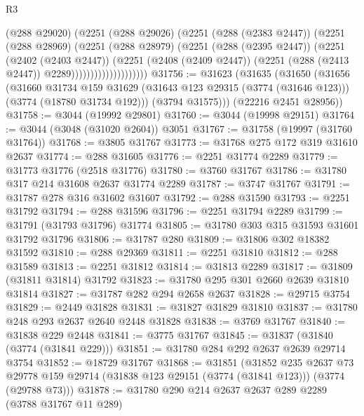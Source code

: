 \begin{lexlean}{R3}
\begin{coremodule}
                            (@288 @29020)
                            (@2251
                              (@288 @29026)
                              (@2251
                                (@288 (@2383 @2447))
                                (@2251
                                  (@288 @28969)
                                  (@2251
                                    (@288 @28979)
                                    (@2251
                                      (@288 (@2395 @2447))
                                      (@2251
                                        (@2402 (@2403 @2447))
                                        (@2251
                                          (@2408 (@2409 @2447))
                                          (@2251 (@288 (@2413 @2447)) @2289))))))))))))))))))))
@31756 := @31623
    (@31635
      (@31650
        (@31656
          (@31660
            @31734
            @159
            @31629
            (@31643 @123 @29315 (@3774 (@31646 @123)))
            (@3774 (@18780 @31734 @192)))
          (@3794 @31575)))
      (@22216 @2451 @28956))
@31758 := @3044 (@19992 @29801)
@31760 := @3044 (@19998 @29151)
@31764 := @3044 (@3048 (@31020 @2604)) @3051
@31767 := @31758 (@19997 (@31760 @31764))
@31768 := @3805 @31767
@31773 := @31768 @275 @172 @319 @31610 @2637
@31774 := @288 @31605
@31776 := @2251 @31774 @2289
@31779 := @31773 @31776 (@2518 @31776)
@31780 := @3760 @31767
@31786 := @31780 @317 @214 @31608 @2637 @31774 @2289
@31787 := @3747 @31767
@31791 := @31787 @278 @316 @31602 @31607
@31792 := @288 @31590
@31793 := @2251 @31792
@31794 := @288 @31596
@31796 := @2251 @31794 @2289
@31799 := @31791 (@31793 @31796) @31774
@31805 := @31780 @303 @315 @31593 @31601 @31792 @31796
@31806 := @31787 @280
@31809 := @31806 @302 @18382 @31592
@31810 := @288 @29369
@31811 := @2251 @31810
@31812 := @288 @31589
@31813 := @2251 @31812
@31814 := @31813 @2289
@31817 := @31809 (@31811 @31814) @31792
@31823 := @31780 @295 @301 @2660 @2639 @31810 @31814
@31827 := @31787 @282 @294 @2658 @2637
@31828 := @29715 @3754
@31829 := @2449 @31828
@31831 := @31827 @31829 @31810
@31837 := @31780 @248 @293 @2637 @2640 @2448 @31828
@31838 := @3769 @31767
@31840 := @31838 @229 @2448
@31841 := @3775 @31767
@31845 := @31837 (@31840 (@3774 (@31841 @229)))
@31851 := @31780 @284 @292 @2637 @2639 @29714 @3754
@31852 := @18729 @31767
@31868 := @31851
    (@31852
      @235
      @2637
      @73
      @29778
      @159
      @29714
      (@31838 @123 @29151 (@3774 (@31841 @123)))
      (@3774 (@29788 @73)))
@31878 := @31780 @290 @214 @2637 @2637 @289 @2289 (@3788 @31767 @11 @289)

\end{coremodule}
\end{lexlean}
